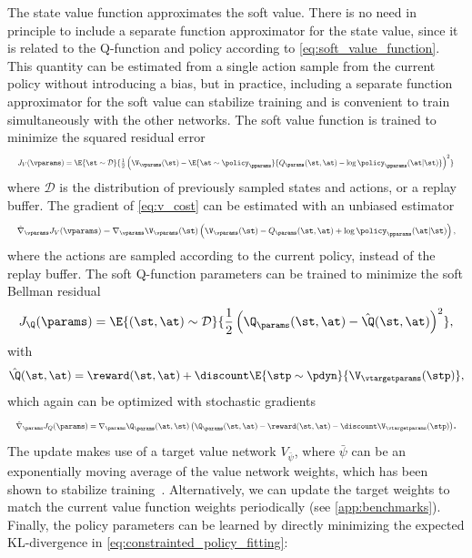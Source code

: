 \documentclass{article}
\begin{document}
The state value function approximates the soft value. There is no need in principle to include a separate function approximator for the state value, since it is related to the Q-function and policy according to \autoref{eq:soft_value_function}. This quantity can be estimated from a single action sample from the current policy without introducing a bias, but in practice, including a separate function approximator for the soft value can stabilize training
%
and is convenient to train simultaneously with the other networks. The soft value function is trained to minimize the squared residual error 
\begin{align}
\label{eq:v_cost}
\resizebox{\columnwidth}{!}{$
J_V(\vparams) = \E{\st \sim \mathcal{D}}{\frac{1}{2}\left(\V_\vparams(\st) - \E{\at\sim\policy_\pparams}{Q_\params(\st, \at) - \log \policy_\pparams(\at|\st)}\right)^2}\,$}
\end{align}
where $\mathcal{D}$ is the distribution of previously sampled states and actions, or a replay buffer. The gradient of \autoref{eq:v_cost} can be estimated with an unbiased estimator
\begin{align}
\resizebox{\columnwidth}{!}{$
\hat \nabla_\vparams J_V(\vparams) = \nabla_\vparams \V_\vparams(\st) \left(\V_\vparams(\st) - Q_\params(\st, \at) + \log \policy_\pparams(\at|\st)\right),$}
\label{eq:v_gradient}
\end{align}
where the actions are sampled according to the current policy, instead of the replay buffer. The soft Q-function parameters can be trained to minimize the soft Bellman residual
\begin{align}
J_\Q(\params) = \E{(\st, \at)\sim\mathcal{D}}{\frac{1}{2}\left(\Q_\params(\st, \at) - \hat \Q(\st, \at)\right)^2},
\label{eq:q_cost}
\end{align}
with 
\begin{align}
\hat \Q(\st, \at) = \reward(\st, \at) + \discount \E{\stp\sim\pdyn}{\V_\vtargetparams(\stp)},
\end{align}
which again can be optimized with stochastic gradients
\begin{align}
\resizebox{\columnwidth}{!}{$
\hat \nabla_\params J_Q(\params) =  \nabla_\params \Q_\params(\at, \st) \left(\Q_\params(\st, \at) - \reward(\st, \at) - \discount \V_\vtargetparams(\stp)\right)$}.
\end{align}
The update  makes use of a target value network $V_{\bar\psi}$, where $\bar\psi$ can be an exponentially moving average of the value network weights, which has been shown to stabilize training~\citep{mnih2015human}. Alternatively, we can update the target weights to match the current value function weights periodically (see \autoref{app:benchmarks}).  Finally, the policy parameters can be learned by directly minimizing the expected KL-divergence in \autoref{eq:constrainted_policy_fitting}:
\end{document}
